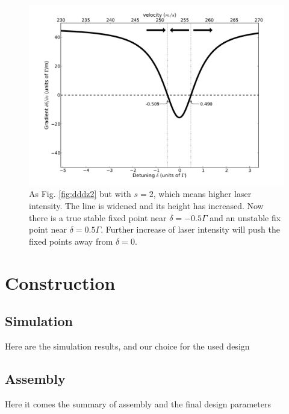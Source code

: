 \documentclass[12pt,a4paper]{article}
\begin{document}
\begin{figure}[htb]
\centering
\includegraphics[width=1.0\textwidth]{detu3}
\caption{As Fig. \ref{fig:dddz2} but with $s = 2$, which means higher laser intensity. The line is widened and its height has increased. Now there is a true stable fixed point near $\delta = -0.5 \Gamma$ and an unstable fix point near $\delta = 0.5 \Gamma$. Further increase of laser intensity will push the fixed points away from $\delta = 0$.}
\label{fig:dddz3}
\end{figure}

\section{Construction}

\subsection{Simulation}

Here are the simulation results, and our choice for the used design

\subsection{Assembly}

Here it comes the summary of assembly and the final design parameters





\end{document}
